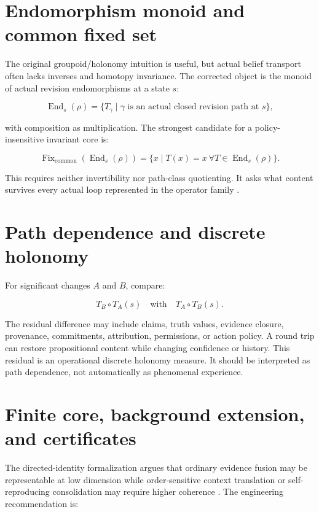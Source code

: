 \documentclass[11pt,oneside]{report}
\newcommand{\Fix}{\operatorname{Fix}}
\newcommand{\Ends}{\operatorname{End}}
\begin{document}
\section{Endomorphism monoid and common fixed set}

The original groupoid/holonomy intuition is useful, but actual belief transport often lacks inverses and homotopy invariance. The corrected object is the monoid of actual revision endomorphisms at a state $s$:

\[
\Ends_s(\rho)=\{T_{\gamma}\mid \gamma\text{ is an actual closed revision path at }s\},
\]

with composition as multiplication. The strongest candidate for a policy-insensitive invariant core is:

\[
\Fix_{\mathrm{common}}(\Ends_s(\rho))
=\{x\mid T(x)=x\ \forall T\in\Ends_s(\rho)\}.
\]

This requires neither invertibility nor path-class quotienting. It asks what content survives every actual loop represented in the operator family \cite{gov-seam,phenom-form}.

\section{Path dependence and discrete holonomy}

For significant changes $A$ and $B$, compare:

\[
T_B\circ T_A(s)
\quad\text{with}\quad
T_A\circ T_B(s).
\]

The residual difference may include claims, truth values, evidence closure, provenance, commitments, attribution, permissions, or action policy. A round trip can restore propositional content while changing confidence or history. This residual is an operational discrete holonomy measure. It should be interpreted as path dependence, not automatically as phenomenal experience.

\section{Finite core, background extension, and certificates}

The directed-identity formalization argues that ordinary evidence fusion may be representable at low dimension while order-sensitive context translation or self-reproducing consolidation may require higher coherence \cite{directed-identity}. The engineering recommendation is:
\end{document}
